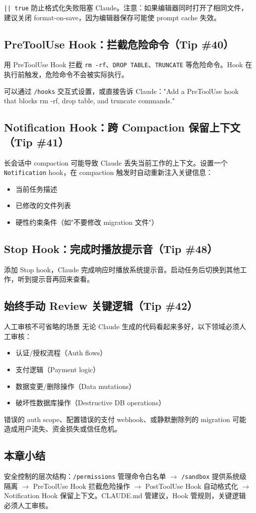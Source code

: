 \texttt{|| true} 防止格式化失败阻塞 Claude。注意：如果编辑器同时打开了相同文件，建议关闭 format-on-save，因为编辑器保存可能使 prompt cache 失效。

\subsection{PreToolUse Hook：拦截危险命令（Tip \#40）}

用 PreToolUse Hook 拦截 \texttt{rm -rf}、\texttt{DROP TABLE}、\texttt{TRUNCATE} 等危险命令。Hook 在执行前触发，危险命令不会被实际执行。

可以通过 \texttt{/hooks} 交互式设置，或直接告诉 Claude："Add a PreToolUse hook that blocks rm -rf, drop table, and truncate commands."

\subsection{Notification Hook：跨 Compaction 保留上下文（Tip \#41）}

长会话中 compaction 可能导致 Claude 丢失当前工作的上下文。设置一个 \texttt{Notification} hook，在 compaction 触发时自动重新注入关键信息：

\begin{itemize}
  \item 当前任务描述
  \item 已修改的文件列表
  \item 硬性约束条件（如"不要修改 migration 文件"）
\end{itemize}

\subsection{Stop Hook：完成时播放提示音（Tip \#48）}

添加 Stop hook，Claude 完成响应时播放系统提示音。启动任务后切换到其他工作，听到提示音再回来查看。

\subsection{始终手动 Review 关键逻辑（Tip \#42）}

\begin{warningbox}{人工审核不可省略的场景}
无论 Claude 生成的代码看起来多好，以下领域必须人工审核：
\begin{itemize}[nosep]
  \item 认证/授权流程（Auth flows）
  \item 支付逻辑（Payment logic）
  \item 数据变更/删除操作（Data mutations）
  \item 破坏性数据库操作（Destructive DB operations）
\end{itemize}
错误的 auth scope、配置错误的支付 webhook、或静默删除列的 migration 可能造成用户流失、资金损失或信任危机。
\end{warningbox}

\subsection{本章小结}

安全控制的层次结构：\texttt{/permissions} 管理命令白名单 $\to$ \texttt{/sandbox} 提供系统级隔离 $\to$ PreToolUse Hook 拦截危险操作 $\to$ PostToolUse Hook 自动格式化 $\to$ Notification Hook 保留上下文。CLAUDE.md 管建议，Hook 管规则，关键逻辑必须人工审核。

